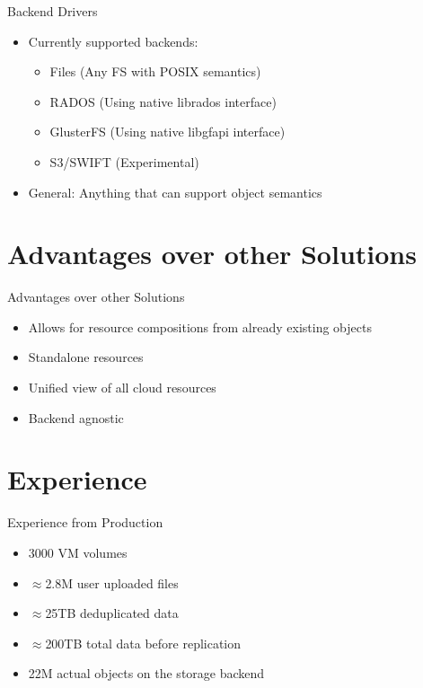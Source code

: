 \documentclass[utf8]{beamer}
\begin{document}
\begin{frame}{Backend Drivers}
  \begin{itemize}
    \item Currently supported backends:
      \begin{itemize}
      \item Files (Any FS with POSIX semantics)
      \item RADOS (Using native librados interface)
      \item GlusterFS (Using native libgfapi interface)
      \item S3/SWIFT (Experimental)
      \end{itemize}
    \item General: Anything that can support object semantics
  \end{itemize}
\end{frame}

\section{Advantages over other Solutions}

\begin{frame}{Advantages over other Solutions}
\begin{itemize}
  \item Allows for resource compositions from already existing objects
  \item Standalone resources
  \item Unified view of all cloud resources
  \item Backend agnostic
\end{itemize}
\end{frame}

\section{Experience}

\begin{frame}{Experience from Production}
\begin{itemize}
  \item 3000 VM volumes
  \item $\approx$2.8M user uploaded files
  \item $\approx$25TB deduplicated data
  \item $\approx$200TB total data before replication
  \item 22M actual objects on the storage backend
\end{itemize}
\end{frame}
\end{document}
